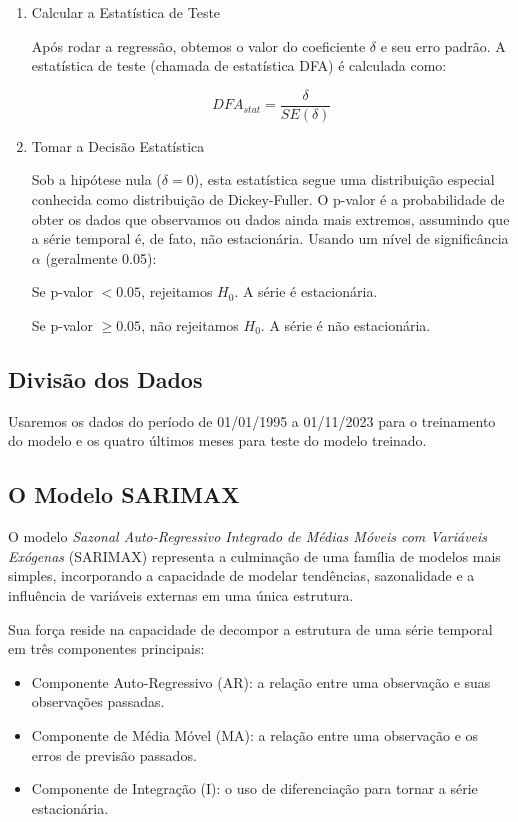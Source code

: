 \documentclass[ 12pt,a4paper ]{article} %
\begin{document}
\begin{itemize}
\begin{enumerate}
			\item Calcular a Estatística de Teste
			
			Após rodar a regressão, obtemos o valor do coeficiente $\delta$ e seu erro padrão. A estatística de teste (chamada de estatística DFA) é calculada como:
			
			$$DFA_{stat}	= \dfrac{\delta}{SE(\delta)}$$
					
			
			
			
			\item Tomar a Decisão Estatística
			
			Sob a hipótese nula ($\delta=0$), esta estatística segue uma distribuição especial conhecida como distribuição de Dickey-Fuller. O p-valor é a probabilidade de obter os dados que observamos ou dados ainda mais extremos, assumindo que a série temporal é, de fato, não estacionária. Usando um nível de significância $\alpha$ (geralmente 0.05):
			
			Se p-valor $< 0.05$, rejeitamos $H_0$. A série é estacionária.
			
			Se p-valor $\geq 0.05$, não rejeitamos $H_0$. A série é não estacionária.
			
		\end{enumerate}
	\end{itemize}
	
	
	\subsection{Divisão dos Dados}
	
	Usaremos os dados do período de 01/01/1995 a 01/11/2023 para o treinamento do modelo e os quatro últimos meses para teste do modelo treinado. 
	
	\subsection{O Modelo SARIMAX}
	
	 
	O modelo \textit{Sazonal Auto-Regressivo Integrado de Médias Móveis com Variáveis Exógenas} (SARIMAX) representa a culminação de uma família de modelos mais simples, incorporando a capacidade de modelar tendências, sazonalidade e a influência de variáveis externas em uma única estrutura.
	
	Sua força reside na capacidade de decompor a estrutura de uma série temporal em três componentes principais:
	
	\begin{itemize}
	\item Componente Auto-Regressivo (AR): a relação entre uma observação e suas observações passadas.
	
	\item Componente de Média Móvel (MA): a relação entre uma observação e os erros de previsão passados.
	
	\item Componente de Integração (I): o uso de diferenciação para tornar a série estacionária.
	\end{itemize}
	
\end{document}

